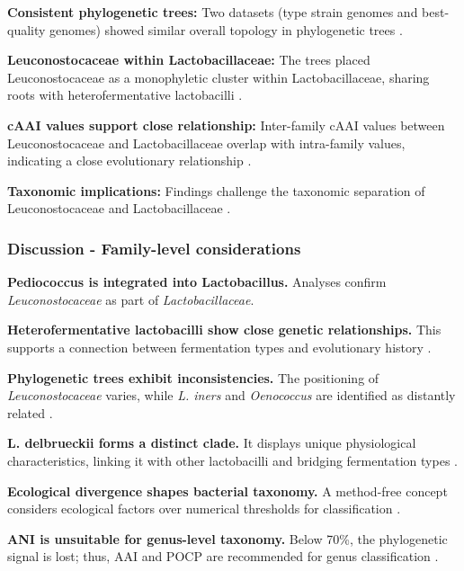 
\textbf{Consistent phylogenetic trees:} Two datasets (type strain genomes and best-quality genomes) showed similar overall topology in phylogenetic trees \cite*{L3-TaxNotes}.

\textbf{Leuconostocaceae within Lactobacillaceae:} The trees placed Leuconostocaceae as a monophyletic cluster within Lactobacillaceae, sharing roots with heterofermentative lactobacilli \cite*{L3-TaxNotes}.

\textbf{cAAI values support close relationship:} Inter-family cAAI values between Leuconostocaceae and Lactobacillaceae overlap with intra-family values, indicating a close evolutionary relationship \cite*{L3-TaxNotes}.

\textbf{Taxonomic implications:} Findings challenge the taxonomic separation of Leuconostocaceae and Lactobacillaceae \cite*{L3-TaxNotes}. 

\subsubsection{Discussion - Family-level considerations}
\textbf{Pediococcus is integrated into Lactobacillus.} Analyses confirm \textit{Leuconostocaceae} as part of \textit{Lactobacillaceae}.

\textbf{Heterofermentative lactobacilli show close genetic relationships.} This supports a connection between fermentation types and evolutionary history \cite*{L3-TaxNotes}.

\textbf{Phylogenetic trees exhibit inconsistencies.} The positioning of \textit{Leuconostocaceae} varies, while \textit{L. iners} and \textit{Oenococcus} are identified as distantly related \cite*{L3-TaxNotes}.

\textbf{L. delbrueckii forms a distinct clade.} It displays unique physiological characteristics, linking it with other lactobacilli and bridging fermentation types \cite*{L3-TaxNotes}.


\textbf{Ecological divergence shapes bacterial taxonomy.} A method-free concept considers ecological factors over numerical thresholds for classification \cite*{L3-TaxNotes}.

\textbf{ANI is unsuitable for genus-level taxonomy.} Below 70\%, the phylogenetic signal is lost; thus, AAI and POCP are recommended for genus classification \cite*{L3-TaxNotes}.

